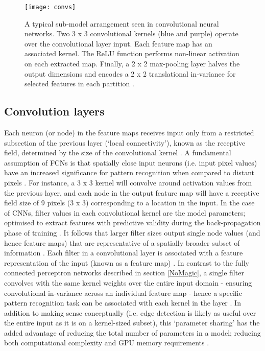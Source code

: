 \begin{figure}[H]
	\begin{center}
		\texttt{[image: convs]}
		\caption{A typical sub-model arrangement seen in convolutional neural networks. Two 3 x 3 convolutional kernels (blue and purple) operate over the convolutional layer input. Each feature map has an associated kernel. The ReLU function performs non-linear activation on each extracted map. Finally, a 2 x 2 max-pooling layer halves the output dimensions and encodes a 2 x 2 translational in-variance for selected features in each partition \cite{Hesamian2019}.}
		\label{fig:convs}
	\end{center}
\end{figure}

\subsection{Convolution layers}
Each neuron (or node) in the feature maps receives input only from a restricted subsection of the previous layer (`local connectivity'), known as the receptive field, determined by the size of the convolutional kernel \cite{Hesamian2019}. A fundamental assumption of FCNs is that spatially close input neurons (i.e. input pixel values) have an increased significance for pattern recognition when compared to distant pixels \cite{Hu2015}. For instance, a 3 x 3 kernel will convolve around activation values from the previous layer, and each node in the output feature map will have a receptive field size of 9 pixels (3 x 3) corresponding to a location in the input. In the case of CNNs, filter values in each convolutional kernel are the model parameters; optimised to extract features with predictive validity during the back-propagation phase of training \cite{Maier2019}. It follows that larger filter sizes output single node values (and hence feature maps) that are representative of a spatially broader subset of information \cite{Nemoto_2020}. Each filter in a convolutional layer is associated with a feature representation of the input (known as a feature map) \cite{Hesamian2019}. In contrast to the fully connected perceptron networks described in section \ref{NoMagic}, a single filter convolves with the same kernel weights over the entire input domain - ensuring convolutional in-variance across an individual feature map \cite{Maier2019} - hence a specific pattern recognition task can be associated with each kernel in the layer \cite{Zeiler_2014}. In addition to making sense conceptually (i.e. edge detection is likely as useful over the entire input as it is on a kernel-sized subset), this `parameter sharing' has the added advantage of reducing the total number of parameters in a model; reducing both computational complexity and GPU memory requirements \cite{Lundervold2019}. 

